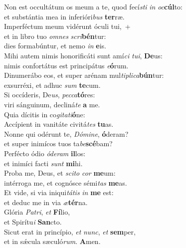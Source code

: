 \evenverse Non est occultátum os meum a te, quod fecí\textit{sti} \textit{in} \textit{oc}\textbf{cúl}to:~\*\\
\evenverse et substántia mea in inferióri\textit{bus} \textbf{ter}ræ.\\
\oddverse Imperféctum meum vidérunt óculi tui,~+\\
\oddverse  et in libro tuo \textit{om}\textit{nes} \textit{scri}\textbf{bén}tur:~\*\\
\oddverse dies formabúntur, et nemo \textit{in} \textbf{e}is.\\
\evenverse Mihi autem nimis honorificáti sunt amí\textit{ci} \textit{tu}\textit{i}, \textbf{De}us:~\*\\
\evenverse nimis confortátus est principátus \textit{e}\textbf{ó}rum.\\
\oddverse Dinumerábo eos, et super arénam mul\textit{ti}\textit{pli}\textit{ca}\textbf{bún}tur:~\*\\
\oddverse exsurréxi, et adhuc \textit{sum} \textbf{te}cum.\\
\evenverse Si occíderis, De\textit{us}, \textit{pec}\textit{ca}\textbf{tó}res:~\*\\
\evenverse viri sánguinum, decliná\textit{te} \textbf{a} me.\\
\oddverse Quia dícitis in co\textit{gi}\textit{ta}\textit{ti}\textbf{ó}ne:~\*\\
\oddverse Accípient in vanitáte civitá\textit{tes} \textbf{tu}as.\\
\evenverse Nonne qui odérunt te, \textit{Dó}\textit{mi}\textit{ne}, \textbf{ó}deram?~\*\\
\evenverse et super inimícos tuos ta\textit{be}\textbf{scé}bam?\\
\oddverse Perfécto ódio \textit{ó}\textit{de}\textit{ram} \textbf{il}los:~\*\\
\oddverse et inimíci facti \textit{sunt} \textbf{mi}hi.\\
\evenverse Proba me, Deus, et \textit{sci}\textit{to} \textit{cor} \textbf{me}um:~\*\\
\evenverse intérroga me, et cognósce sémi\textit{tas} \textbf{me}as.\\
\oddverse Et vide, si via iniqui\textit{tá}\textit{tis} \textit{in} \textbf{me} est:~\*\\
\oddverse et deduc me in via \textit{æ}\textbf{tér}na.\\
\evenverse Glória \textit{Pa}\textit{tri}, \textit{et} \textbf{Fí}lio,~\*\\
\evenverse et Spirítu\textit{i} \textbf{San}cto.\\
\oddverse Sicut erat in princípio, \textit{et} \textit{nunc}, \textit{et} \textbf{sem}per,~\*\\
\oddverse et in sǽcula sæculó\textit{rum}. \textbf{A}men.\\
